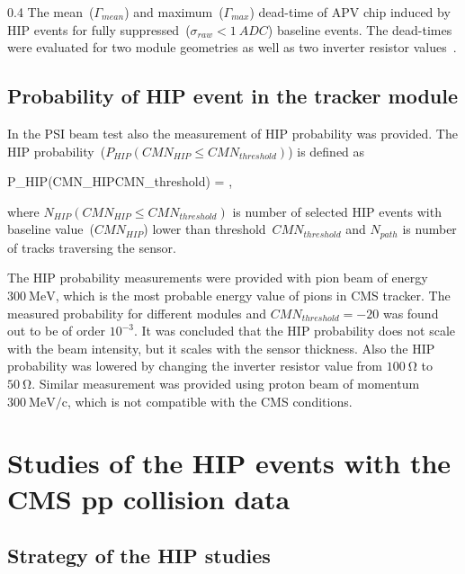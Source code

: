                  {0.4}       %
                 {The mean~($\Gamma_{mean}$) and maximum~($\Gamma_{max}$) dead-time of APV chip induced by HIP events for fully suppressed~($\sigma_{raw}<1~ADC$) baseline events. The dead-times were evaluated for two module geometries as well as two inverter resistor values~\cite{Bainbridge:2004jc}.} %


\subsection{Probability of HIP event in the tracker module}

In the PSI beam test also the measurement of HIP probability was provided. The HIP probability~($P_{HIP}(CMN_{HIP}\leq CMN_{threshold})$) is defined as 

{
P_{HIP}(CMN_{HIP}\leq CMN_{threshold}) = ,
}

where $N_{HIP}(CMN_{HIP}\leq CMN_{threshold})$ is number of selected HIP events with baseline value~($CMN_{HIP}$) lower than threshold~$CMN_{threshold}$ and $N_{path}$ is number of tracks traversing the sensor.

The HIP probability measurements were provided with pion beam of energy $300~\mathrm{MeV}$, which is the most probable energy value of pions in CMS tracker. The measured probability for different modules and $CMN_{threshold}=-20$ was found out to be of order $10^{-3}$. It was concluded that the HIP probability does not scale with the beam intensity, but it scales with the sensor thickness. Also the HIP probability was lowered by changing the inverter resistor value from $100~\mathrm{\Omega}$ to  $50~\mathrm{\Omega}$. Similar measurement was provided using proton beam of momentum $300~\mathrm{MeV/c}$, which is not compatible with the CMS conditions.


\section{Studies of the HIP events with the CMS pp collision data}

\subsection{Strategy of the HIP studies}


